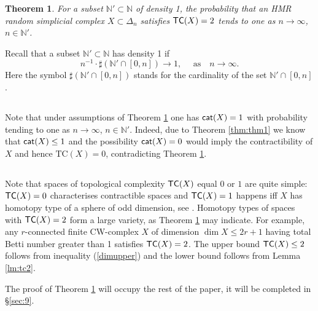 \documentclass[11pt,twoside, reqno]{amsart}
\theoremstyle{plain}
\newtheorem{teo}[lema]{Theorem}
\theoremstyle{definition}
\newcommand{\N}{\mathbb{N}}
\newcommand{\TC}{\textrm{TC}}
\newcommand{\cat}{{\sf{cat}}}
\newcommand{\tc}{{\sf{TC}}}
\begin{document}
\begin{teo}\label{thm:tc2}
For a subset $\N'\subset \N$ of density 1, the probability that an HMR random simplicial complex $X\subset \Delta_n$ satisfies $\tc(X)=2$ tends to one as $n\to \infty$, $n\in \N'$. 
\end{teo} 

Recall that a subset $\N'\subset \N$ has density 1 if $$n^{-1}\cdot \sharp(\N'\cap [0,n])\to 1, \quad \mbox{ as}\quad  n\to \infty.$$ 
Here the symbol $\sharp(\N'\cap [0,n])$ stands for the cardinality of the set $\N'\cap [0,n]$. 

\subsection{} Note that under assumptions of Theorem \ref{thm:tc2} one has $\cat(X)=1$ with probability tending to one as $n\to \infty$, $n\in \N'$. Indeed, due to Theorem 
\ref{thm:thm1} we know that $\cat(X)\le 1$ and the possibility $\cat(X)=0$ would imply the contractibility of  $X$ and hence $\TC(X)=0$, 
 contradicting Theorem \ref{thm:tc2}. 
 
 \subsection{} Note that spaces of topological complexity $\tc(X)$ equal $0$ or $1$ are quite simple: $\tc(X)=0$ characterises contractible spaces and $\tc(X)=1$ happens iff $X$ has homotopy type of a sphere of odd dimension, see \cite{GLO}. 
 Homotopy types of spaces with $\tc(X)=2$ form a large variety, as Theorem \ref{thm:tc2} may indicate. For example, any $r$-connected 
 finite CW-complex $X$ of dimension $\dim X\le 2r+1$ having total Betti number greater than 1 satisfies $\tc(X)=2$. The upper bound $\tc(X)\le 2$ follows from inequality (\ref{dimupper}) and the lower bound follows from Lemma \ref{lm:tc2}. 

The proof of Theorem \ref{thm:tc2} will occupy the rest of the paper, it will be completed in \S \ref{sec:9}. 


\end{document}
